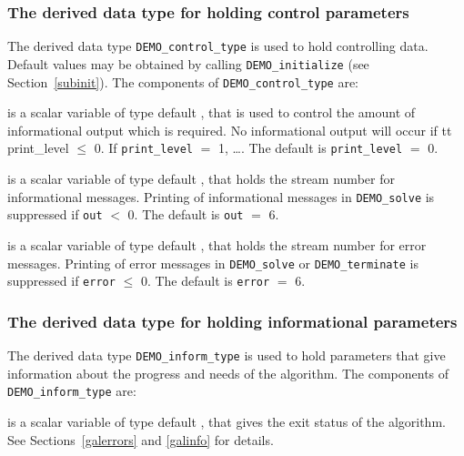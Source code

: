 \documentclass{galahad}
\newcommand{\packagename}{DEMO}
\begin{document}

\subsubsection{The derived data type for holding control 
 parameters}\label{typecontrol}
The derived data type 
{\tt \packagename\_control\_type} 
is used to hold controlling data. Default values may be obtained by calling 
{\tt \packagename\_initialize}
(see Section~\ref{subinit}). The components of 
{\tt \packagename\_control\_type} 
are:

\begin{description}

 is a scalar variable of type default \integer, that is used
to control the amount of informational output which is required. No 
informational output will occur if {tt print\_level} $\leq$ 0. If 
{\tt print\_level} $=$ 1, \ldots .
The default is {\tt print\_level} $=$ 0.

 is a scalar variable of type default \integer, that holds the
stream number for informational messages.
Printing of informational messages in 
{\tt \packagename\_solve}
is suppressed if {\tt out} $<$ 0.
The default is {\tt out} $=$ 6.

 is a scalar variable of type default \integer, that holds the
stream number for error messages.
Printing of error messages in 
{\tt \packagename\_solve}
or 
{\tt \packagename\_terminate}
is suppressed if {\tt error} $\leq$ 0.
The default is {\tt error} $=$ 6.

\end{description}


\subsubsection{The derived data type for holding informational
 parameters}\label{typeinform}
The derived data type 
{\tt \packagename\_inform\_type} 
is used to hold parameters that give information about the progress and needs 
of the algorithm. The components of
{\tt \packagename\_inform\_type} 
are:

\begin{description}
 is a scalar variable of type default \integer, that gives the
exit status of the algorithm. See Sections~\ref{galerrors} and \ref{galinfo}
for details.
\end{description}
\end{document}
